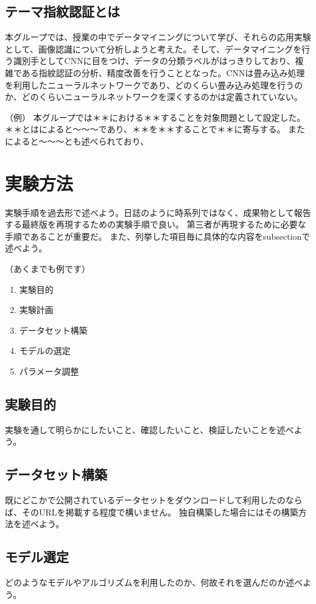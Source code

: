 \documentclass[a4paper, 11pt, titlepage]{jsarticle}
\begin{document}
\subsection{テーマ指紋認証とは}
本グループでは、授業の中でデータマイニングについて学び、それらの応用実験として、画像認識について分析しようと考えた。そして、データマイニングを行う識別手としてCNNに目をつけ、データの分類ラベルがはっきりしており、複雑である指紋認証の分析、精度改善を行うこととなった。CNNは畳み込み処理を利用したニューラルネットワークであり、どのくらい畳み込み処理を行うのか、どのくらいニューラルネットワークを深くするのかは定義されていない。

（例）
本グループでは＊＊における＊＊することを対象問題として設定した。
＊＊とは\cite{theme1}によると〜〜〜であり、＊＊を＊＊することで＊＊に寄与する。
また\cite{theme2}によると〜〜〜とも述べられており、



\section{実験方法}
実験手順を過去形で述べよう。日誌のように時系列ではなく、成果物として報告する最終版を再現するための実験手順で良い。
第三者が再現するために必要な手順であることが重要だ。
また、列挙した項目毎に具体的な内容をsubsectionで述べよう。

（あくまでも例です）
\begin{enumerate}
 \item 実験目的
 \item 実験計画
 \item データセット構築
 \item モデルの選定
 \item パラメータ調整
\end{enumerate}

\subsection{実験目的}
実験を通して明らかにしたいこと、確認したいこと、検証したいことを述べよう。

\subsection{データセット構築}
既にどこかで公開されているデータセットをダウンロードして利用したのならば、そのURLを掲載する程度で構いません。
独自構築した場合にはその構築方法を述べよう。

\subsection{モデル選定}
どのようなモデルやアルゴリズムを利用したのか、何故それを選んだのか述べよう。
\end{document}
